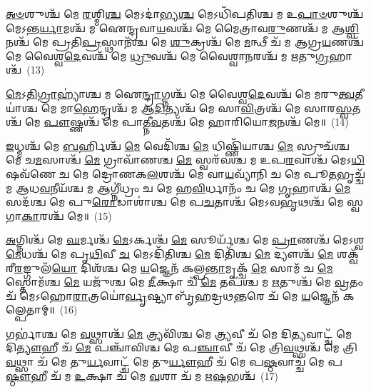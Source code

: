 {\anuvakamend[{𑌤𑍍𑌵𑌷𑍍𑌟𑌾᳴ \ul{𑌚} 𑌦𑍍𑌯𑍗𑌶𑍍𑌚᳴ \ul{𑌮} 𑌏𑌕᳴𑌵𑌿𑍞𑌶𑌤𑌿𑌶𑍍𑌚}]}%

\-\ul{𑌅}\-\-\ul{𑍞}\-𑌶𑍁𑌶𑍍𑌚᳴ 𑌮𑍇 \ul{𑌰}\-𑌶𑍍𑌮𑌿\-\ul{𑌶𑍍𑌚} 𑌮𑍇\-𑌽𑌦𑌾॑𑌭𑍍𑌯\-\ul{𑌶𑍍𑌚} 𑌮𑍇\-𑌽𑌧𑌿᳴𑌪𑌤𑌿𑌶𑍍𑌚 𑌮 𑌉\-\ul{𑌪𑌾}\-\-\ul{𑍞}\-𑌶𑍁𑌶𑍍𑌚᳴ 𑌮𑍇\-𑌽𑌨𑍍𑌤\-\ul{𑌰𑍍𑌯𑌾}\-𑌮𑌶𑍍𑌚᳴ 𑌮 𑌐𑌨𑍍𑌦𑍍𑌰𑌵𑌾\-\ul{𑌯}\-𑌵𑌶𑍍𑌚᳴ 𑌮𑍇 𑌮𑍈𑌤𑍍𑌰𑌾𑌵\-\ul{𑌰𑍁}\-𑌣𑌶𑍍𑌚᳴ 𑌮 𑌆\-\ul{𑌶𑍍𑌵𑌿}\-𑌨𑌶𑍍𑌚᳴ 𑌮𑍇 𑌪𑍍𑌰𑌤𑌿\-\ul{𑌪𑍍𑌰}\-𑌸𑍍𑌥𑌾𑌨᳴𑌶𑍍𑌚 𑌮𑍇 \ul{𑌶𑍁}\-𑌕𑍍𑌰𑌶𑍍𑌚᳴ 𑌮𑍇 \ul{𑌮}\-𑌨𑍍𑌥𑍀 𑌚᳴ 𑌮 𑌆𑌗𑍍𑌰\-\ul{𑌯}\-𑌣𑌶𑍍𑌚᳴ 𑌮𑍇 𑌵𑍈𑌶𑍍𑌵\-\ul{𑌦𑍇}\-𑌵𑌶𑍍𑌚᳴ 𑌮𑍇 \ul{𑌧𑍍𑌰𑍁}\-𑌵𑌶𑍍𑌚᳴ 𑌮𑍇 𑌵𑍈𑌶𑍍𑌵𑌾\-\ul{𑌨}\-𑌰𑌶𑍍𑌚᳴ 𑌮 𑌋𑌤𑍁\-\ul{𑌗𑍍𑌰}\-𑌹𑌾𑌶𑍍𑌚᳴~(13)

\-\ul{𑌮𑍇}\-\-𑌽\-\ul{𑌤𑌿}\-\-\ul{𑌗𑍍𑌰𑌾}\-𑌹𑍍𑌯𑌾॑𑌶𑍍𑌚 𑌮 𑌐\-\ul{𑌨𑍍𑌦𑍍𑌰𑌾}\-𑌗𑍍𑌨𑌶𑍍𑌚᳴ 𑌮𑍇 𑌵𑍈𑌶𑍍𑌵\-\ul{𑌦𑍇}\-𑌵𑌶𑍍𑌚᳴ 𑌮𑍇 𑌮𑌰𑍁\-\ul{𑌤𑍍𑌵}\-𑌤𑍀𑌯𑌾॑𑌶𑍍𑌚 𑌮𑍇 𑌮𑌾\-\ul{𑌹𑍇}\-𑌨𑍍𑌦𑍍𑌰𑌶𑍍𑌚᳴ 𑌮 𑌆\-\ul{𑌦𑌿}\-𑌤𑍍𑌯𑌶𑍍𑌚᳴ 𑌮𑍇 𑌸𑌾\-\ul{𑌵𑌿}\-𑌤𑍍𑌰𑌶𑍍𑌚᳴ 𑌮𑍇 𑌸𑌾𑌰\-\ul{𑌸𑍍𑌵}\-𑌤𑌶𑍍𑌚᳴ 𑌮𑍇 \ul{𑌪𑍗}\-𑌷𑍍𑌣𑌶𑍍𑌚᳴ 𑌮𑍇 𑌪𑌾𑌤𑍍𑌨𑍀\-\ul{𑌵}\-𑌤𑌶𑍍𑌚᳴ 𑌮𑍇 𑌹𑌾𑌰𑌿𑌯𑍋\-\ul{𑌜}\-𑌨𑌶𑍍𑌚᳴ 𑌮𑍇॥~(14)

{\anuvakamend[{\-\ul{𑌋}\-\-\ul{𑌤𑍁}\-\-\ul{𑌗𑍍𑌰}\-𑌹𑌾\-\ul{𑌶𑍍𑌚} 𑌚𑌤𑍁᳴𑌸𑍍𑌤𑍍𑌰𑌿𑍞𑌶𑌚𑍍𑌚}]}%

\-\ul{𑌇}\-𑌧𑍍𑌮𑌶𑍍𑌚᳴ 𑌮𑍇 \ul{𑌬}\-𑌰𑍍\mbox{}𑌹𑌿𑌶𑍍𑌚᳴ \ul{𑌮𑍇} 𑌵𑍇𑌦𑌿᳴𑌶𑍍𑌚 \ul{𑌮𑍇} 𑌧𑌿𑌷𑍍𑌣𑌿᳴𑌯𑌾𑌶𑍍𑌚 \ul{𑌮𑍇} 𑌸𑍍𑌰𑍁𑌚᳴𑌶𑍍𑌚 𑌮𑍇 𑌚\-\ul{𑌮}\-𑌸𑌾𑌶𑍍𑌚᳴ \ul{𑌮𑍇} 𑌗𑍍𑌰𑌾𑌵𑌾᳴𑌣𑌶𑍍𑌚 \ul{𑌮𑍇} 𑌸𑍍𑌵𑌰᳴𑌵𑌶𑍍𑌚 𑌮 𑌉𑌪\-\ul{𑌰}\-𑌵𑌾𑌶𑍍𑌚᳴ 𑌮𑍇\-𑌽\-\ul{𑌧𑌿}\-𑌷𑌵᳴𑌣𑍇 𑌚 𑌮𑍇 𑌦𑍍𑌰𑍋𑌣𑌕\-\ul{𑌲}\-𑌶𑌶𑍍𑌚᳴ 𑌮𑍇 𑌵𑌾\-\ul{𑌯}\-𑌵𑍍𑌯𑌾᳴𑌨𑌿 𑌚 𑌮𑍇 𑌪𑍂\-\ul{𑌤}\-𑌭𑍃𑌚𑍍𑌚᳴ 𑌮 𑌆𑌧\-\ul{𑌵}\-𑌨𑍀𑌯᳴𑌶𑍍𑌚 \ul{𑌮} 𑌆𑌗𑍍𑌨𑍀॑𑌧𑍍𑌰𑌂 𑌚 𑌮𑍇 𑌹\-\ul{𑌵𑌿}\-𑌰𑍍𑌧𑌾𑌨𑌂᳴ 𑌚 𑌮𑍇 \ul{𑌗𑍃}\-𑌹𑌾𑌶𑍍𑌚᳴ \ul{𑌮𑍇} 𑌸𑌦᳴𑌶𑍍𑌚 𑌮𑍇 𑌪𑍁\-\ul{𑌰𑍋}\-𑌡𑌾𑌶𑌾॑𑌶𑍍𑌚 𑌮𑍇 𑌪\-\ul{𑌚}\-𑌤𑌾𑌶𑍍𑌚᳴ 𑌮𑍇\-𑌽𑌵\-\ul{𑌭𑍃}\-𑌥𑌶𑍍𑌚᳴ 𑌮𑍇 𑌸𑍍𑌵𑌗𑌾\-\ul{𑌕𑌾}\-𑌰𑌶𑍍𑌚᳴ 𑌮𑍇॥~(15)

{\anuvakamend[{\-\ul{𑌗𑍃}\-𑌹𑌾\-\ul{𑌶𑍍𑌚} 𑌷𑍋𑌡᳴𑌶 𑌚}]}%

\-\ul{𑌅}\-𑌗𑍍𑌨𑌿𑌶𑍍𑌚᳴ 𑌮𑍇 \ul{𑌘}\-𑌰𑍍𑌮𑌶𑍍𑌚᳴ \ul{𑌮𑍇}\-\-𑌽𑌰𑍍𑌕𑌶𑍍𑌚᳴ \ul{𑌮𑍇} 𑌸𑍂𑌰𑍍𑌯᳴𑌶𑍍𑌚 𑌮𑍇 \ul{𑌪𑍍𑌰𑌾}\-𑌣𑌶𑍍𑌚᳴ 𑌮𑍇\-𑌽𑌶𑍍𑌵\-\ul{𑌮𑍇}\-𑌧𑌶𑍍𑌚᳴ 𑌮𑍇 𑌪𑍃\-\ul{𑌥𑌿}\-𑌵𑍀 \ul{𑌚} 𑌮𑍇\-𑌽𑌦𑌿᳴𑌤𑌿𑌶𑍍𑌚 \ul{𑌮𑍇} 𑌦𑌿𑌤𑌿᳴𑌶𑍍𑌚 \ul{𑌮𑍇} 𑌦𑍍𑌯𑍗𑌶𑍍𑌚᳴ \ul{𑌮𑍇} 𑌶𑌕𑍍𑌵᳴𑌰𑍀\-\ul{𑌰}\-𑌙𑍍𑌗𑍁𑌲᳴\-\ul{𑌯𑍋} 𑌦𑌿𑌶᳴𑌶𑍍𑌚 𑌮𑍇 \ul{𑌯}\-𑌜𑍍𑌞𑍇𑌨᳴ 𑌕𑌲𑍍𑌪\-\ul{𑌨𑍍𑌤𑌾}\-𑌮𑍃𑌕𑍍𑌚᳴ \ul{𑌮𑍇} 𑌸𑌾𑌮᳴ 𑌚 \ul{𑌮𑍇} 𑌸𑍍𑌤𑍋𑌮᳴𑌶𑍍𑌚 \ul{𑌮𑍇} 𑌯𑌜𑍁᳴𑌶𑍍𑌚 𑌮𑍇 \ul{𑌦𑍀}\-𑌕𑍍𑌷𑌾 𑌚᳴ \ul{𑌮𑍇} 𑌤𑌪᳴𑌶𑍍𑌚 𑌮 \ul{𑌋}\-𑌤𑍁𑌶𑍍𑌚᳴ 𑌮𑍇 \ul{𑌵𑍍𑌰}\-𑌤𑌂 𑌚᳴ 𑌮𑍇\-𑌽𑌹𑍋\-\ul{𑌰𑌾}\-𑌤𑍍𑌰𑌯𑍋॑\-\ul{𑌰𑍍𑌵𑍃}\-𑌷𑍍𑌟𑍍𑌯𑌾 𑌬𑍃᳴𑌹𑌦𑍍𑌰𑌥\-\ul{𑌨𑍍𑌤}\-𑌰𑍇 𑌚᳴ 𑌮𑍇 \ul{𑌯}\-𑌜𑍍𑌞𑍇𑌨᳴ 𑌕𑌲𑍍𑌪𑍇𑌤𑌾𑌮𑍍॥~(16)

{\anuvakamend[{\-\ul{𑌦𑍀}\-𑌕𑍍𑌷𑌾\-𑌽𑌷𑍍𑌟𑌾𑌦᳴𑌶 𑌚}]}%

𑌗𑌰𑍍𑌭𑌾॑𑌶𑍍𑌚 𑌮𑍇 \ul{𑌵}\-𑌥𑍍𑌸𑌾𑌶𑍍𑌚᳴ \ul{𑌮𑍇} 𑌤𑍍𑌰𑍍𑌯𑌵𑌿᳴𑌶𑍍𑌚 𑌮𑍇 \ul{𑌤𑍍𑌰𑍍𑌯}\-𑌵𑍀 𑌚᳴ 𑌮𑍇 𑌦𑌿\-\ul{𑌤𑍍𑌯}\-𑌵𑌾𑌟𑍍𑌚᳴ 𑌮𑍇 𑌦𑌿\-\ul{𑌤𑍍𑌯𑍗}\-𑌹𑍀 𑌚᳴ \ul{𑌮𑍇} 𑌪𑌞𑍍𑌚𑌾᳴𑌵𑌿𑌶𑍍𑌚 𑌮𑍇 𑌪\-\ul{𑌞𑍍𑌚𑌾}\-𑌵𑍀 𑌚᳴ 𑌮𑍇 𑌤𑍍𑌰𑌿\-\ul{𑌵}\-𑌥𑍍𑌸𑌶𑍍𑌚᳴ 𑌮𑍇 𑌤𑍍𑌰𑌿\-\ul{𑌵}\-𑌥𑍍𑌸𑌾 𑌚᳴ 𑌮𑍇 𑌤𑍁\-\ul{𑌰𑍍𑌯}\-𑌵𑌾𑌟𑍍𑌚᳴ 𑌮𑍇 𑌤𑍁\-\ul{𑌰𑍍𑌯𑍗}\-𑌹𑍀 𑌚᳴ 𑌮𑍇 𑌪\-\ul{𑌷𑍍𑌠}\-𑌵𑌾𑌚𑍍𑌚᳴ 𑌮𑍇 𑌪\-\ul{𑌷𑍍𑌠𑍗}\-𑌹𑍀 𑌚᳴ 𑌮 \ul{𑌉}\-𑌕𑍍𑌷𑌾 𑌚᳴ 𑌮𑍇 \ul{𑌵}\-𑌶𑌾 𑌚᳴ 𑌮 𑌋\-\ul{𑌷}\-𑌭𑌶𑍍𑌚᳴~(17)

